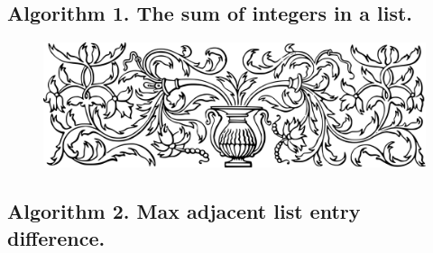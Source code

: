 \documentclass[preview]{standalone}
\begin{document}
\subsection[The sum of integers in a list.]{
    \color{section} Algorithm 1. \color{black} The sum of integers in a list.
}
\vspace{-1\baselineskip}

\begin{center}
    
\end{center}
\vspace{.3\baselineskip}
\begin{center}
    
\end{center}

\pagebreak


\begin{figure}[!h]
    \centering
    \includegraphics[width=14cm]{../resources/jpg/3.1.algorithms/border1.png}
\end{figure}
\subsection[Max adjacent list entry difference.]{
    \color{section} Algorithm 2. \color{black} Max adjacent list entry difference.
}
\vspace{-1\baselineskip}

\begin{center}
    
\end{center}
\begin{center}
    
\end{center}
\pagebreak
\end{document}
